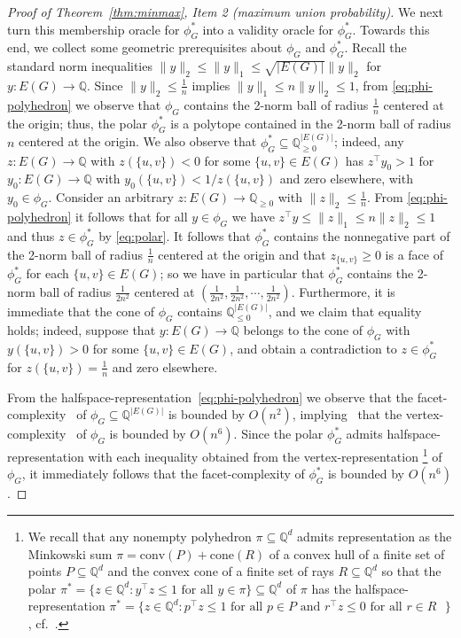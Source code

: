 \documentclass[11pt]{article}
\newcommand{\conv}{\text{conv}}
\newcommand{\cone}{\text{cone}}
\begin{document}
\begin{proof}[Proof of Theorem~\ref{thm:minmax}, Item 2 (maximum union probability)]
We next turn this membership oracle for $\phi_G^*$ 
into a validity oracle for $\phi_G^*$. Towards this end, we collect some
geometric prerequisites about $\phi_G$ and $\phi_G^*$. 
Recall the standard norm inequalities 
$\|y\|_2\leq \|y\|_1\leq \sqrt{|E(G)|}\|y\|_2$ for 
$y:E(G)\rightarrow\mathbb{Q}$. Since $\|y\|_2\leq\frac{1}{n}$ implies
$\|y\|_1\leq n\|y\|_2\leq 1$, from \eqref{eq:phi-polyhedron} 
we observe that $\phi_G$ contains the 2-norm ball of 
radius $\frac{1}{n}$ centered at the origin; thus, the polar $\phi_G^*$ is 
a polytope contained in the 2-norm ball of radius $n$ centered at the origin. 
We also observe that $\phi_G^*\subseteq\mathbb{Q}^{|E(G)|}_{\geq 0}$; 
indeed, any $z:E(G)\rightarrow\mathbb{Q}$ with $z(\{u,v\})<0$ for
some $\{u,v\}\in E(G)$ has $z^\top y_0>1$ for $y_0:E(G)\rightarrow\mathbb{Q}$
with $y_0(\{u,v\})<1/z(\{u,v\})$ and zero elsewhere, 
with $y_0\in\phi_G$. 
Consider an arbitrary $z:E(G)\rightarrow\mathbb{Q}_{\geq 0}$ 
with $\|z\|_2\leq\frac{1}{n}$. From \eqref{eq:phi-polyhedron}
it follows that for all $y\in\phi_G$ we have
$z^\top y\leq \|z\|_1\leq n\|z\|_2\leq 1$ and thus
$z\in\phi_G^*$ by \eqref{eq:polar}. It follows that
$\phi_G^*$ contains the nonnegative part of the 2-norm ball of
radius $\frac{1}{n}$ centered at the origin and that $z_{\{u,v\}}\geq 0$
is a face of $\phi_G^*$ for each $\{u,v\}\in E(G)$; so we
have in particular that $\phi_G^*$ contains the
2-norm ball of radius $\frac{1}{2n^2}$ centered at 
$(\frac{1}{2n^2},\frac{1}{2n^2},\cdots,\frac{1}{2n^2})$.
Furthermore, it is immediate that the cone of $\phi_G$ contains 
$\mathbb{Q}^{|E(G)|}_{\leq 0}$, and we claim that equality holds;
indeed, suppose that $y:E(G)\rightarrow\mathbb{Q}$ belongs to the 
cone of $\phi_G$ with $y(\{u,v\})>0$ for some $\{u,v\}\in E(G)$,
and obtain a contradiction to $z\in\phi_G^*$ for $z(\{u,v\})=\frac{1}{n}$
and zero elsewhere. 

From the halfspace-representation~\eqref{eq:phi-polyhedron} we 
observe that the facet-complexity~\cite[Definition~6.2.2]{GrotschelLS1993} 
of $\phi_G\subseteq\mathbb{Q}^{|E(G)|}$ is bounded by $O(n^2)$, 
implying~\cite[Lemma~6.2.3]{GrotschelLS1993} that the 
vertex-complexity~\cite[Definition~6.2.2]{GrotschelLS1993} of
$\phi_G$ is bounded by $O(n^6)$.
Since the polar $\phi_G^*$ admits halfspace-representation with each 
inequality obtained from the vertex-representation%
\footnote{We recall that any nonempty 
polyhedron $\pi\subseteq\mathbb{Q}^d$ admits 
representation as the Minkowski sum $\pi=\conv(P)+\cone(R)$ of a convex hull 
of a finite set of points $P\subseteq\mathbb{Q}^d$ and the convex cone of
a finite set of rays $R\subseteq\mathbb{Q}^d$ so that the polar
$\pi^*=\{z\in\mathbb{Q}^d:y^\top z\leq 1\text{ for all $y\in\pi$}\}\subseteq\mathbb{Q}^d$ of $\pi$ has the halfspace-representation 
$\pi^*=\{z\in\mathbb{Q}^d:
p^\top z\leq 1\text{ for all $p\in P$ and } 
r^\top z\leq 0\text{ for all $r\in R$ }\}$, 
cf.~\cite[Sect.~0.1]{GrotschelLS1993}.}{}
of $\phi_G$, it immediately follows that 
the facet-complexity of $\phi_G^*$ is bounded by $O(n^6)$.



\end{proof}
\end{document}
